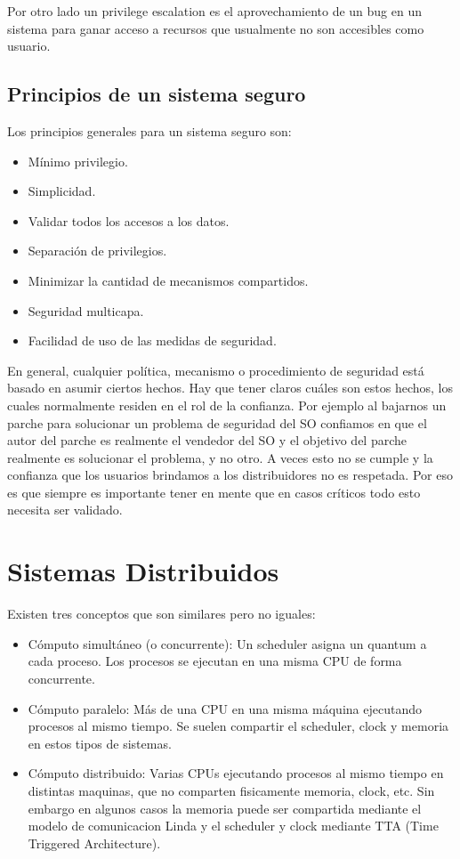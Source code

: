 \documentclass{article}
\begin{document}
Por otro lado un privilege escalation es el aprovechamiento de un bug en un sistema para ganar acceso a recursos que usualmente no son accesibles como usuario.

\subsection{Principios de un sistema seguro}

Los principios generales para un sistema seguro son:
\begin{itemize}
\item Mínimo privilegio.
\item Simplicidad.
\item Validar todos los accesos a los datos.
\item Separación de privilegios.
\item Minimizar la cantidad de mecanismos compartidos.
\item Seguridad multicapa.
\item Facilidad de uso de las medidas de seguridad.
\end{itemize}

En general, cualquier política, mecanismo o procedimiento de seguridad está basado en asumir ciertos hechos. Hay que tener claros cuáles son estos hechos, los cuales normalmente residen en el rol de la confianza. Por ejemplo al bajarnos un parche para solucionar un problema de seguridad del SO confiamos en que el autor del parche es realmente el vendedor del SO y el objetivo del parche realmente es solucionar el problema, y no otro. A veces esto no se cumple y la confianza que los usuarios brindamos a los distribuidores no es respetada. Por eso es que siempre es importante tener en mente que en casos críticos todo esto necesita ser validado.

\section{Sistemas Distribuidos}

Existen tres conceptos que son similares pero no iguales:

\begin{itemize}
\item C\'omputo simult\'aneo (o concurrente): Un scheduler asigna un quantum a cada proceso. Los procesos se ejecutan en una misma CPU de forma concurrente.
\item C\'omputo paralelo: M\'as de una CPU en una misma m\'aquina ejecutando procesos al mismo tiempo. Se suelen compartir el scheduler, clock y memoria en estos tipos de sistemas.
\item C\'omputo distribuido: Varias CPUs ejecutando procesos al mismo tiempo en distintas maquinas, que no comparten fisicamente memoria, clock, etc. Sin embargo en algunos casos la memoria puede ser compartida mediante el modelo de comunicacion Linda y el scheduler y clock mediante TTA (Time Triggered Architecture).
\end{itemize}
\end{document}
